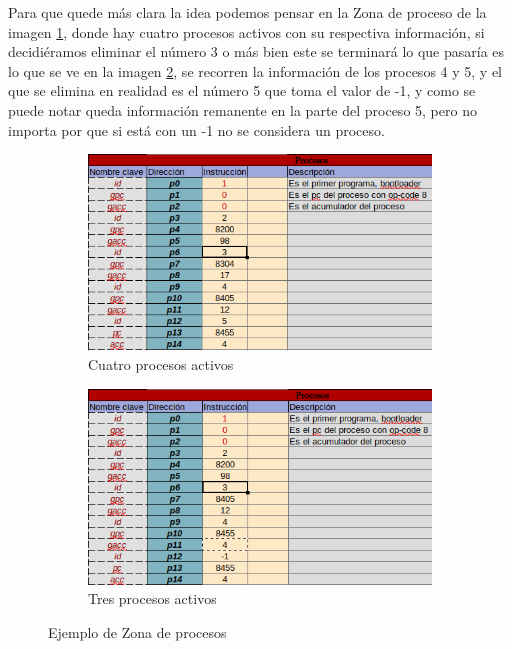 \documentclass[12pt]{article}
\begin{document}
   Para que quede más clara la idea podemos pensar en la Zona de proceso de la imagen \ref{fig:procesos1},
   donde hay cuatro procesos activos con su respectiva información, si decidiéramos eliminar el número
   3 o más bien este se terminará lo que pasaría es lo que se ve en la imagen \ref{fig:procesos2}, se
   recorren la información de los procesos 4 y 5, y el que se elimina en realidad es el número 5 que
   toma el valor de -1, y como se puede notar queda información remanente en la parte del proceso 5,
   pero no importa por que si está con un -1 no se considera un proceso.
   
   \begin{figure}
		  	\centering
		  			\begin{subfigure}[b]{0.48\textwidth}
				      \centering
						\includegraphics[width=\textwidth]{media/procesos1} 
						\caption{Cuatro procesos activos}
						\label{fig:procesos1}
				  \end{subfigure}
			\hfill
				  \begin{subfigure}[b]{0.48\textwidth}
				      \centering
						\includegraphics[width=\textwidth]{media/procesos2} 
						\caption{Tres procesos activos}
						\label{fig:procesos2}
				  \end{subfigure}
		   \caption{Ejemplo de Zona de procesos}
		   \label{fig:ejemploZona}
	\end{figure}
\end{document}
